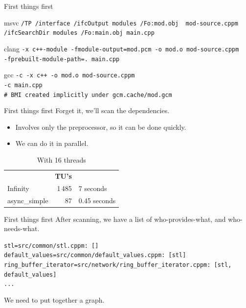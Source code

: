\documentclass[]{beamer}
\begin{document}
\begin{frame}{First things first}
  \begin{block}{msvc }
    \footnotesize{
    \texttt{/TP /interface {\color{magenta}/ifcOutput modules} /Fo:mod.obj {\color{blue} mod-source.cppm}} \\
    \texttt{{\color{magenta}/ifcSearchDir modules} /Fo:main.obj main.cpp}
    }
  \end{block}
  \begin{block}{clang }
    \footnotesize{
    \texttt{-x c++-module -fmodule-output={\color{red}mod.pcm} -o mod.o {\color{blue}mod-source.cppm}} \\
    \texttt{{\color{magenta}-fprebuilt-module-path=.} main.cpp}
    }
  \end{block}
  \begin{block}{gcc }
    \footnotesize{
    \texttt{-c -x c++ -o mod.o mod-source.cppm} \\
    \texttt{-c main.cpp} \\
    {\color{teal}\texttt{\# BMI created implicitly under \texttt{gcm.cache/mod.gcm}}}
    }
  \end{block}
\end{frame}

\begin{frame}{First things first}
  Forget it, we'll scan the dependencies.
  \begin{itemize}
    \item Involves only the preprocessor, so it can be done quickly.
    \item We can do it in parallel.
  \end{itemize}
  \begin{table}
    \begin{tabular}{l r l}
                    & \textbf{TU's} &              \\
      Infinity      & 1\,485        & 7 seconds    \\
      async\_simple & 87            & 0.45 seconds
    \end{tabular}
    \caption*{With 16 threads}
  \end{table}
\end{frame}

\begin{frame}[containsverbatim]{First things first}
  After scanning, we have a list of who-provides-what, and who-needs-what.
  \begin{block}{}
    \footnotesize{
    \texttt{{\color{blue}stl}=src/common/stl.cppm: []\\
    {\color{blue}default\_values}=src/common/default\_values.cppm: [{\color{purple}stl}]\\
    {\color{blue}ring\_buffer\_iterator}=src/network/ring\_buffer\_iterator.cppm: [{\color{purple}stl, default\_values}]\\
    ...}
    }
  \end{block}
  We need to put together a graph.
\end{frame}
\end{document}
